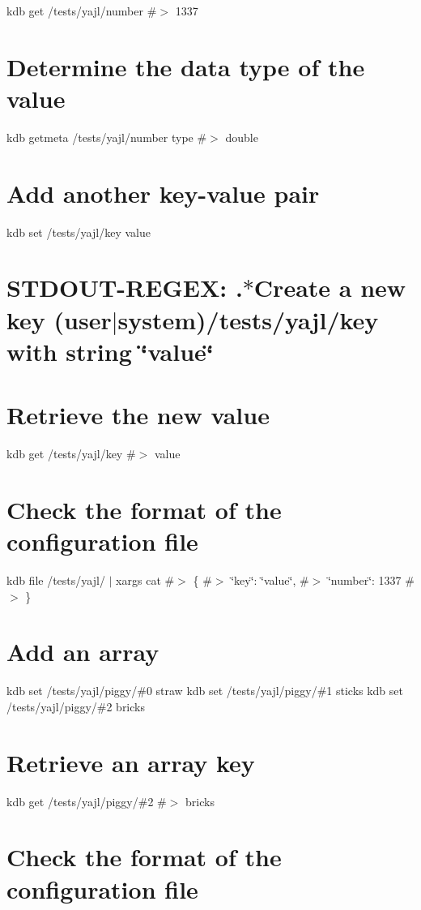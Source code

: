 kdb get /tests/yajl/number \#$>$ 1337

\section*{Determine the data type of the value}

kdb getmeta /tests/yajl/number type \#$>$ double

\section*{Add another key-\/value pair}

kdb set /tests/yajl/key value \section*{S\+T\+D\+O\+U\+T-\/\+R\+E\+G\+EX\+: .$\ast$\+Create a new key (user$\vert$system)/tests/yajl/key with string \char`\"{}value\char`\"{}}

\section*{Retrieve the new value}

kdb get /tests/yajl/key \#$>$ value

\section*{Check the format of the configuration file}

kdb file /tests/yajl/ $\vert$ xargs cat \#$>$ \{ \#$>$ \char`\"{}key\char`\"{}\+: \char`\"{}value\char`\"{}, \#$>$ \char`\"{}number\char`\"{}\+: 1337 \#$>$ \}

\section*{Add an array}

kdb set /tests/yajl/piggy/\#0 straw kdb set /tests/yajl/piggy/\#1 sticks kdb set /tests/yajl/piggy/\#2 bricks

\section*{Retrieve an array key}

kdb get /tests/yajl/piggy/\#2 \#$>$ bricks

\section*{Check the format of the configuration file}

